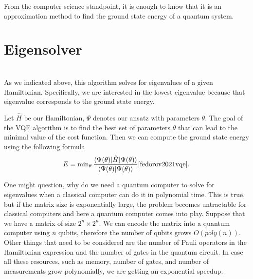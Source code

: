 From the computer science standpoint, it is enough to know that it is an approximation method to find the ground state energy of a quantum system.

\section{Eigensolver}
\\
As we indicated above, this algorithm solves for eigenvalues of a given Hamiltonian. Specifically, we are interested in the lowest eigenvalue because that eigenvalue corresponds to the ground state energy. 

Let $\hat{H}$ be our Hamiltonian, $\Psi$ denotes our ansatz with parameters $\theta$. The goal of the VQE algorithm is to find the best set of parameters $\theta$ that can lead to the minimal value of the cost function. Then we can compute the ground state energy using the following formula 
\begin{equation} \label{eq:cost-function}
E = \min\nolimits_{\theta} \frac{\langle\Psi(\theta)\rvert\hat{H}\lvert\Psi(\theta)\rangle}{\langle\Psi(\theta)\vert\Psi(\theta)\rangle}\cite{fedorov2021vqe} \text{.}
\end{equation}


One might question, why do we need a quantum computer to solve for eigenvalues when a classical computer can do it in polynomial time. This is true, but if the matrix size is exponentially large, the problem becomes untractable for classical computers and here a quantum computer comes into play. Suppose that we have a matrix of size $2^n \times 2^n$. We can encode the matrix into a quantum computer using $n$ qubits, therefore the number of qubits grows $O(poly(n))$. Other things that need to be considered are the number of Pauli operators in the Hamiltonian expression and the number of gates in the quantum circuit. In case all these resources, such as memory, number of gates, and number of measurements grow polynomially, we are getting an exponential speedup.


